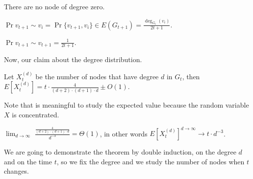     \obs There are no node of degree zero.
    
    \obs $\Pr{v_{t+1} \sim v_i} = \Pr{\{ v_{t+1}, v_i \} \in E(G_{t+1})} = \frac{\deg_{G_t}(v_i)}{2t+1}$.
    
    \obs $\Pr{v_{t+1} \sim v_{t+1}} = \frac{1}{2t+1}$.
    
    Now, our claim about the degree distribution.
    
    \begin{thm}\label{thm:pref-attach-degree}
        Let $X_t^{\left(d\right)}$ be the number of nodes that have degree $d$ in $G_t$, then \\ $E\left[X_t^{\left(d\right)}\right] = t \cdot \frac{4}{(d+2) \cdot (d+1) \cdot d} \pm O(1)$.
    \end{thm}

    Note that is meaningful to study the expected value because the random variable $X$ is concentrated.
    
    \obs $\lim_{d \to \infty}$ $\frac{\frac{4}{(d+2) \cdot (d+1) \cdot d}}{d^{-3}} = \Theta(1)$, in other words $E\left[X_t^{\left(d\right)}\right]^{d \to \infty} \to t \cdot d^{-3}$.
    
    We are going to demonstrate the theorem by double induction, on the degree $d$ and on the time $t$, so we fix the degree and we study the number of nodes when $t$ changes.
    
